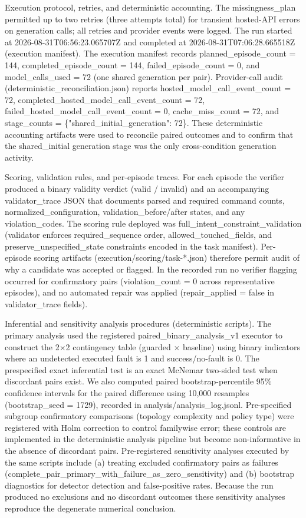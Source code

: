 \documentclass[conference]{IEEEtran}
\begin{document}
Execution protocol, retries, and deterministic accounting. The missingness\_plan permitted up to two retries (three attempts total) for transient hosted-API errors on generation calls; all retries and provider events were logged. The run started at 2026-08-31T06:56:23.065707Z and completed at 2026-08-31T07:06:28.665518Z (execution manifest). The execution manifest records planned\_episode\_count = 144, completed\_episode\_count = 144, failed\_episode\_count = 0, and model\_calls\_used = 72 (one shared generation per pair). Provider-call audit (deterministic\_reconciliation.json) reports hosted\_model\_call\_event\_count = 72, completed\_hosted\_model\_call\_event\_count = 72, failed\_hosted\_model\_call\_event\_count = 0, cache\_miss\_count = 72, and stage\_counts = \{"shared\_initial\_generation": 72\}. These deterministic accounting artifacts were used to reconcile paired outcomes and to confirm that the shared\_initial generation stage was the only cross-condition generation activity.

Scoring, validation rules, and per-episode traces. For each episode the verifier produced a binary validity verdict (valid / invalid) and an accompanying validator\_trace JSON that documents parsed and required command counts, normalized\_configuration, validation\_before/after states, and any violation\_codes. The scoring rule deployed was full\_intent\_constraint\_validation (validator enforces required\_sequence order, allowed\_touched\_fields, and preserve\_unspecified\_state constraints encoded in the task manifest). Per-episode scoring artifacts (execution/scoring/task-*.json) therefore permit audit of why a candidate was accepted or flagged. In the recorded run no verifier flagging occurred for confirmatory pairs (violation\_count = 0 across representative episodes), and no automated repair was applied (repair\_applied = false in validator\_trace fields).

Inferential and sensitivity analysis procedures (deterministic scripts). The primary analysis used the registered paired\_binary\_analysis\_v1 executor to construct the 2\ensuremath{\times}2 contingency table (guarded \ensuremath{\times} baseline) using binary indicators where an undetected executed fault is 1 and success/no-fault is 0. The prespecified exact inferential test is an exact McNemar two-sided test when discordant pairs exist. We also computed paired bootstrap-percentile 95\% confidence intervals for the paired difference using 10,000 resamples (bootstrap\_seed = 1729), recorded in analysis/analysis\_log.jsonl. Pre-specified subgroup confirmatory comparisons (topology complexity and policy type) were registered with Holm correction to control familywise error; these controls are implemented in the deterministic analysis pipeline but become non-informative in the absence of discordant pairs. Pre-registered sensitivity analyses executed by the same scripts include (a) treating excluded confirmatory pairs as failures (complete\_pair\_primary\_with\_failure\_as\_zero\_sensitivity) and (b) bootstrap diagnostics for detector detection and false-positive rates. Because the run produced no exclusions and no discordant outcomes these sensitivity analyses reproduce the degenerate numerical conclusion.
\end{document}
